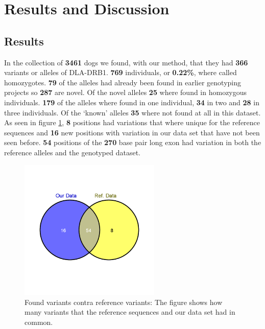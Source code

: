 \section{Results and Discussion}

\subsection{Results}

In the collection of \textbf{3461} dogs we found, with our method, that they had \textbf{366} variants or alleles of DLA-DRB1. \textbf{769} individuals, or \textbf{0.22\%}, where called homozygotes. \textbf{79} of the alleles had already been found in earlier genotyping projects so \textbf{287} are novel. Of the novel alleles \textbf{25} where found in homozygous individuals. \textbf{179} of the alleles where found in one individual, \textbf{34} in two and \textbf{28} in three individuals. Of the `known' alleles \textbf{35} where not found at all in this dataset.\\ As seen in figure \ref{fig:variants}, \textbf{8} positions had variations that where unique for the reference sequences and \textbf{16} new positions with variation in our data set that have not been seen before. \textbf{54} positions of the \textbf{270} base pair long exon had variation in both the reference alleles and the genotyped dataset.

\begin{figure}[ht]
	\centering
		\includegraphics[width=0.6\textwidth]{../pictures/variants.png}
	\caption{Found variants contra reference variants: The figure shows how many variants that the reference sequences and our data set had in common.}
	\label{fig:variants}
\end{figure}


